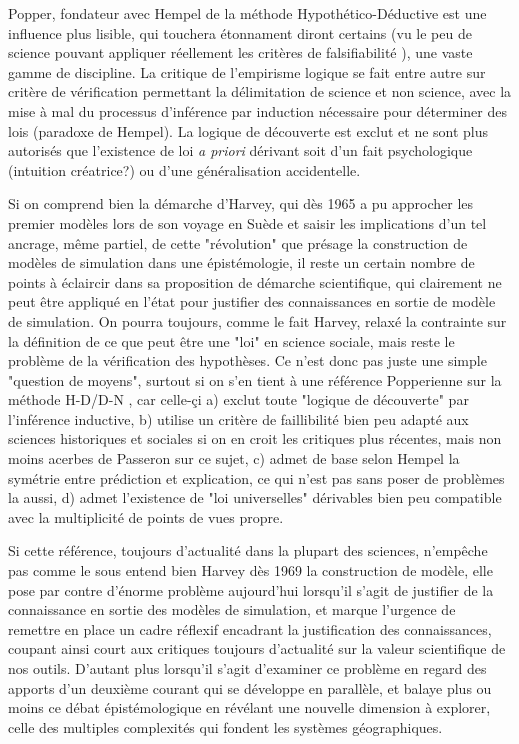 {Popper, fondateur avec Hempel de la méthode Hypothético-Déductive est une influence plus lisible, qui touchera étonnament diront certains (vu le peu de science pouvant appliquer réellement les critères de falsifiabilité ), une vaste gamme de discipline. La critique de l'empirisme logique se fait entre autre sur critère de vérification permettant la délimitation de science et non science, avec la mise à mal du processus d'inférence par induction nécessaire pour déterminer des lois (paradoxe de Hempel). La logique de découverte est exclut et ne sont plus autorisés que l'existence de loi \textit{a priori} dérivant soit d'un fait psychologique (intuition créatrice?) ou d'une généralisation accidentelle.

Si on comprend bien la démarche d'Harvey, qui dès 1965 a pu approcher les premier modèles lors de son voyage en Suède et saisir les implications d'un tel ancrage, même partiel, de cette "révolution" que présage la construction de modèles de simulation dans une épistémologie, il reste un certain nombre de points à éclaircir dans sa proposition de démarche scientifique, qui clairement ne peut être appliqué en l'état pour justifier des connaissances en sortie de modèle de simulation. On pourra toujours, comme le fait Harvey, relaxé la contrainte sur la définition de ce que peut être une "loi" en science sociale, mais reste le problème de la vérification des hypothèses. Ce n'est donc pas juste une simple "question de moyens", surtout si on s'en tient à une référence Popperienne sur la méthode H-D/D-N , car celle-çi a) exclut toute "logique de découverte" par l'inférence inductive, b) utilise un critère de faillibilité bien peu adapté aux sciences historiques et sociales si on en croit les critiques plus récentes, mais non moins acerbes de Passeron sur ce sujet, c) admet de base selon Hempel la symétrie entre prédiction et explication, ce qui n'est pas sans poser de problèmes la aussi, d) admet l'existence de "loi universelles" dérivables bien peu compatible avec la multiplicité de points de vues propre.

Si cette référence, toujours d'actualité dans la plupart des sciences, n'empêche pas comme le sous entend bien Harvey dès 1969 la construction de modèle, elle pose par contre d'énorme problème aujourd'hui lorsqu'il s'agit de justifier de la connaissance en sortie des modèles de simulation, et marque l'urgence de remettre en place un cadre réflexif encadrant la justification des connaissances, coupant ainsi court aux critiques toujours d'actualité sur la valeur scientifique de nos outils. D'autant plus lorsqu'il s'agit d'examiner ce problème en regard des apports d'un deuxième courant qui se développe en parallèle, et balaye plus ou moins ce débat épistémologique en révélant une nouvelle dimension à explorer, celle des multiples complexités \autocite{Dauphiné2003} qui fondent les systèmes géographiques.



}
